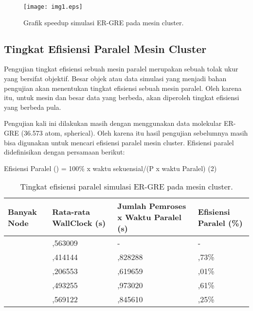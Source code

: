 \documentclass[aps,showpacs,pre,floatfix]{revtex4}
\begin{document}
\begin{figure}
\texttt{[image: img1.eps]}\\
  \caption{Grafik speedup simulasi ER-GRE pada
mesin cluster.}\label{g2}
\end{figure}




\subsection{Tingkat Efisiensi Paralel Mesin Cluster}

Pengujian tingkat efisiensi sebuah mesin paralel merupakan sebuah
tolak ukur yang bersifat objektif. Besar objek atau data simulasi
yang menjadi bahan pengujian akan menentukan tingkat efisiensi
sebuah mesin paralel. Oleh karena itu, untuk mesin dan besar data
yang berbeda, akan diperoleh tingkat efisiensi yang berbeda pula.

Pengujian kali ini dilakukan masih dengan menggunakan data
molekular ER-GRE (36.573 atom, spherical). Oleh karena itu hasil
pengujian sebelumnya masih bisa digunakan untuk mencari efisiensi
paralel mesin cluster. Efisiensi paralel didefinisikan dengan
persamaan berikut:

\begin{center}

{\footnotesize Efisiensi Paralel () =
100\% x waktu sekuensial/(P x waktu Paralel)         (2)}
\end{center}


\begin{table}
  \centering


\begin{tabular}{|p{64pt}|p{91pt}|p{91pt}|p{91pt}|}
\hline
\parbox{64pt}{\centering
Banyak Node } & \parbox{91pt}{\centering Rata-rata WallClock (s) }
& \parbox{91pt}{\centering Jumlah Pemroses x Waktu Paralel (s) } &
\parbox{91pt}{\centering Efisiensi Paralel (\%)
} \\
\hline
\parbox{64pt}{
} & \parbox{91pt}{,563009
} & \parbox{91pt}{\centering
-
} & \parbox{91pt}{\centering
-
} \\
\parbox{64pt}{
} & \parbox{91pt}{,414144
} & \parbox{91pt}{,828288
} & \parbox{91pt}{,73\%
} \\
\parbox{64pt}{
} & \parbox{91pt}{,206553
} & \parbox{91pt}{,619659
} & \parbox{91pt}{,01\%
} \\
\parbox{64pt}{
} & \parbox{91pt}{,493255
} & \parbox{91pt}{,973020
} & \parbox{91pt}{,61\%
} \\
\parbox{64pt}{
} & \parbox{91pt}{,569122
} & \parbox{91pt}{,845610
} & \parbox{91pt}{,25\%
} \\
\hline
\end{tabular}

\caption{Tingkat efisiensi paralel simulasi ER-GRE pada mesin
cluster.}\label{T3}
\end{table}
\end{document}
